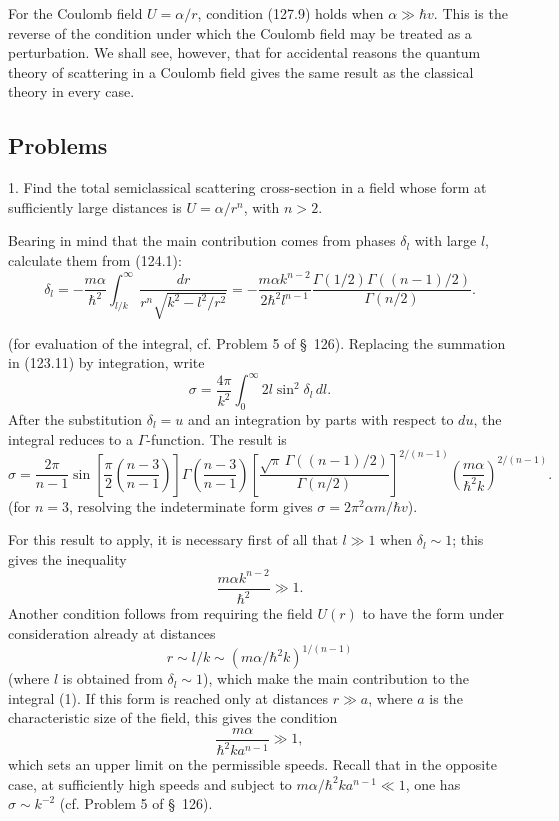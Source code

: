 For the Coulomb field $U=\alpha/r$, condition (127.9) holds when $\alpha\gg\hbar v$. This is the reverse of the condition under which the Coulomb field may be treated as a perturbation. We shall see, however, that for accidental reasons the quantum theory of scattering in a Coulomb field gives the same result as the classical theory in every case.

\subsection*{Problems}

1. Find the total semiclassical scattering cross-section in a field whose form at sufficiently large distances is $U=\alpha/r^n$, with $n>2$.

\SolutionHeading Bearing in mind that the main contribution comes from phases $\delta_l$ with large $l$, calculate them from (124.1):
\begin{equation}
 \delta_l=-\frac{m\alpha}{\hbar^2}\int_{l/k}^{\infty}\frac{dr}{r^n\sqrt{k^2-l^2/r^2}}
 =-\frac{m\alpha k^{n-2}}{2\hbar^2l^{n-1}}
 \frac{\Gamma(1/2)\Gamma((n-1)/2)}{\Gamma(n/2)}.
 \tag{1}
\end{equation}

(for evaluation of the integral, cf. Problem 5 of \S~126). Replacing the summation in (123.11) by integration, write
\[
 \sigma=\frac{4\pi}{k^2}\int_0^\infty2l\sin^2\delta_l\,dl.
\]
After the substitution $\delta_l=u$ and an integration by parts with respect to $du$, the integral reduces to a $\Gamma$-function. The result is
\begin{equation}
 \sigma=\frac{2\pi}{n-1}\sin\left[\frac\pi2\left(\frac{n-3}{n-1}\right)\right]
 \Gamma\left(\frac{n-3}{n-1}\right)
 \left[\frac{\sqrt\pi\,\Gamma((n-1)/2)}{\Gamma(n/2)}\right]^{2/(n-1)}
 \left(\frac{m\alpha}{\hbar^2k}\right)^{2/(n-1)}.
 \tag{2}
\end{equation}
(for $n=3$, resolving the indeterminate form gives $\sigma=2\pi^2\alpha m/\hbar v$).

For this result to apply, it is necessary first of all that $l\gg1$ when $\delta_l\sim1$; this gives the inequality
\[
 \frac{m\alpha k^{n-2}}{\hbar^2}\gg1.
\]
Another condition follows from requiring the field $U(r)$ to have the form under consideration already at distances
\[
 r\sim l/k\sim(m\alpha/\hbar^2k)^{1/(n-1)}
\]
(where $l$ is obtained from $\delta_l\sim1$), which make the main contribution to the integral (1). If this form is reached only at distances $r\gg a$, where $a$ is the characteristic size of the field, this gives the condition
\[
 \frac{m\alpha}{\hbar^2ka^{n-1}}\gg1,
\]
which sets an upper limit on the permissible speeds. Recall that in the opposite case, at sufficiently high speeds and subject to $m\alpha/\hbar^2ka^{n-1}\ll1$, one has $\sigma\sim k^{-2}$ (cf. Problem 5 of \S~126).

